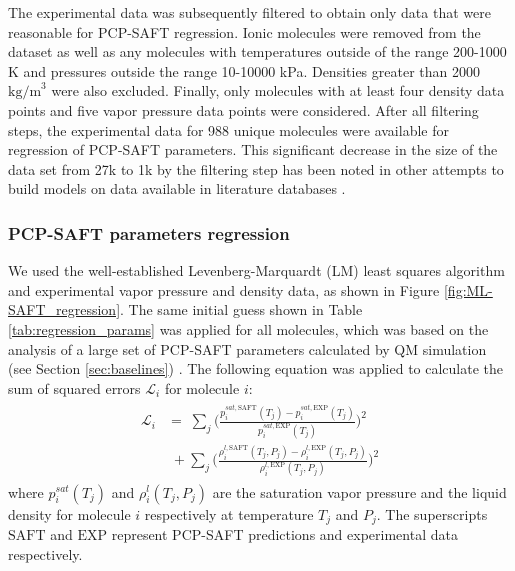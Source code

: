 The experimental data was subsequently filtered to obtain only data that were reasonable for PCP-SAFT regression. Ionic molecules were removed from the dataset as well as any molecules with temperatures outside of the range 200-1000 K and pressures outside the range 10-10000 kPa. Densities greater than 2000 $\text{kg/m}^{3}$ were also excluded. Finally, only molecules with at least four density data points and five vapor pressure data points were considered. After all filtering steps, the experimental data for 988 unique molecules were available for regression of PCP-SAFT parameters. This significant decrease in the size of the data set from 27k to 1k by the filtering step has been noted in other attempts to build models on data available in literature databases \cite{Fitzner2020, Gao2018}. 

\subsubsection{PCP-SAFT parameters regression}

We used the well-established Levenberg-Marquardt (LM) least squares algorithm and experimental vapor pressure and density data, as shown in Figure \ref{fig:ML-SAFT_regression}. The same initial guess shown in Table \ref{tab:regression_params} was applied for all molecules, which was based on the analysis of a large set of PCP-SAFT parameters calculated by QM simulation (see Section \ref{sec:baselines}) \cite{Kaminski2020}. The following equation was applied to calculate the sum of squared errors $\mathcal{L}_i$ for molecule $i$:
\begin{gather}
\begin{aligned}
    \mathcal{L}_i & = \; \sum_j \biggl(\frac{p_{i}^{sat,\text{SAFT}}(T_j) - p_{i}^{sat,\text{EXP}}(T_j)}{ p_{i}^{sat,\text{EXP}}(T_j)}\biggr)^2 \\
    & \; + \sum_j \biggl(\frac{\rho_{i}^{l,\text{SAFT}}(T_j, P_j) - \rho_{i}^{l,\text{EXP}}(T_j, P_j) }{\rho_{i}^{l,\text{EXP}}(T_j, P_j) }\biggr)^2 
\end{aligned}
\end{gather}
where $p_i^{sat}(T_j)$ and $\rho_{i}^{l}(T_j, P_j)$ are the saturation vapor pressure and the liquid density for molecule $i$ respectively at temperature $T_j$ and $P_j$. The superscripts $\text{SAFT}$ and $\text{EXP}$ represent PCP-SAFT predictions and experimental data respectively. 

